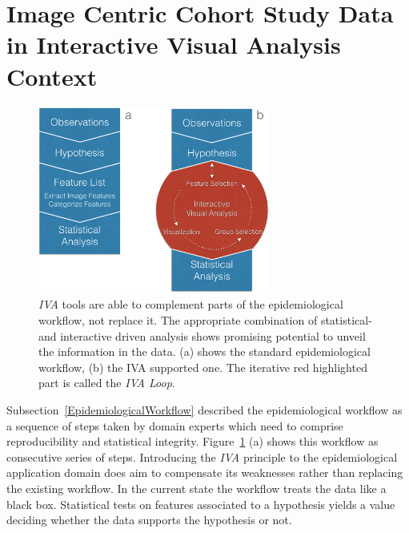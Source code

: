 \documentclass[journal]{style/vgtc} 			          %
\begin{document}
\section{Image Centric Cohort Study Data in Interactive Visual Analysis Context} \label{Image Centric Cohort Study Data in Interactive Visual Analysis Context}
\begin{figure}[htb]
 \centering
 \includegraphics[width=3.0in]{figures/workflow_comparison}
 \caption{\emph{IVA} tools are able to complement parts of the epidemiological workflow, not replace it. The appropriate combination of statistical- and interactive driven analysis shows promising potential to unveil the information in the data. (a) shows the standard epidemiological workflow, (b) the IVA supported one. The iterative red highlighted part is called the \emph{IVA Loop}.}
  \label{fig:WorkflowComparison}
\end{figure}
%
Subsection~\ref{EpidemiologicalWorkflow} described the epidemiological workflow as a sequence of steps taken by domain experts which need to comprise reproducibility and statistical integrity.
%
Figure~\ref{fig:WorkflowComparison} (a) shows this workflow as consecutive series of steps.
%
Introducing the \emph{IVA} principle to the epidemiological application domain does aim to compensate its weaknesses rather than replacing the existing workflow.
%
In the current state the workflow treats the data like a black box.
%
Statistical tests on features associated to a hypothesis yields a value deciding whether the data supports the hypothesis or not.
\end{document}
